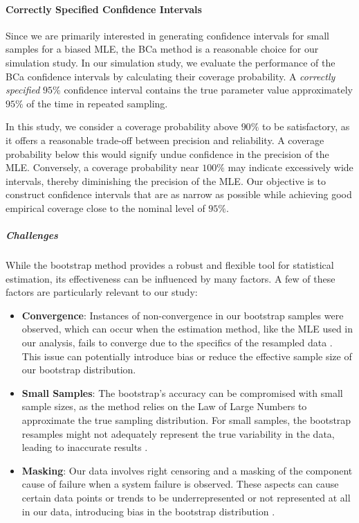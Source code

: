 \documentclass[
]{article}
\providecommand{\tightlist}{%
  \setlength{\itemsep}{0pt}\setlength{\parskip}{0pt}}
\theoremstyle{definition}
\theoremstyle{plain}
\theoremstyle{definition}
\theoremstyle{definition}
\theoremstyle{definition}
\theoremstyle{definition}
\theoremstyle{remark}
\begin{document}
\hypertarget{correctly-specified-confidence-intervals}{%
\paragraph*{Correctly Specified Confidence Intervals}\label{correctly-specified-confidence-intervals}}

Since we are primarily interested in generating confidence intervals for small
samples for a biased MLE, the BCa method is a reasonable choice for our
simulation study. In our simulation study, we evaluate the performance of the
BCa confidence intervals by calculating their coverage probability. A \emph{correctly
specified} \(95\%\) confidence interval contains the true parameter value
approximately \(95\%\) of the time in repeated sampling.

In this study, we consider a coverage probability above \(90\%\) to be
satisfactory, as it offers a reasonable trade-off between precision and
reliability. A coverage probability below this would signify undue confidence in
the precision of the MLE. Conversely, a coverage probability near \(100\%\) may
indicate excessively wide intervals, thereby diminishing the precision of the
MLE. Our objective is to construct confidence intervals that are as narrow as
possible while achieving good empirical coverage close to the nominal level of
\(95\%\).

\hypertarget{challenges}{%
\subparagraph*{Challenges}\label{challenges}}

While the bootstrap method provides a robust and flexible tool for statistical
estimation, its effectiveness can be influenced by many factors. A few of these
factors are particularly relevant to our study:

\begin{itemize}
\tightlist
\item
  \textbf{Convergence}: Instances of non-convergence in our bootstrap samples were
  observed, which can occur when the estimation method, like the MLE used in our
  analysis, fails to converge due to the specifics of the resampled data
  \citep{casella2002statistical}. This issue can potentially introduce bias or
  reduce the effective sample size of our bootstrap distribution.
\item
  \textbf{Small Samples}: The bootstrap's accuracy can be compromised with small
  sample sizes, as the method relies on the Law of Large Numbers to approximate
  the true sampling distribution. For small samples, the bootstrap resamples might
  not adequately represent the true variability in the data, leading to inaccurate
  results \citep{efron1994introduction}.
\item
  \textbf{Masking}: Our data involves right censoring and a masking of the component
  cause of failure when a system failure is observed. These aspects can cause
  certain data points or trends to be underrepresented or not represented at all
  in our data, introducing bias in the bootstrap distribution \citep{klein2005survival}.
\end{itemize}
\end{document}
